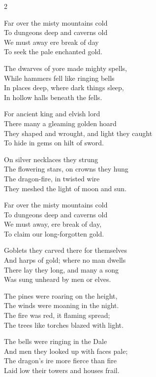 
\begin{multicols}{2}
    
\ve{}
Far over the misty mountains cold\\
To dungeons deep and caverns old\\
We must away ere break of day\\
To seek the pale enchanted gold.

\ve{}
The dwarves of yore made mighty spells,\\
While hammers fell like ringing bells\\
In places deep, where dark things sleep,\\
In hollow halls beneath the fells.

\ve{}
For ancient king and elvish lord\\
There many a gleaming golden hoard\\
They shaped and wrought, and light they caught\\
To hide in gems on hilt of sword.

\ve{}
On silver necklaces they strung\\
The flowering stars, on crowns they hung\\
The dragon-fire, in twisted wire\\
They meshed the light of moon and sun.

\ve{}
Far over the misty mountains cold\\
To dungeons deep and caverns old\\
We must away, ere break of day,\\
To claim our long-forgotten gold.

\ve{}
Goblets they carved there for themselves\\
And harps of gold; where no man dwells\\
There lay they long, and many a song\\
Was sung unheard by men or elves.

\ve{}
The pines were roaring on the height,\\
The winds were moaning in the night.\\
The fire was red, it flaming spread;\\
The trees like torches blazed with light.

\ve{}
The bells were ringing in the Dale\\
And men they looked up with faces pale;\\
The dragon’s ire more fierce than fire\\
Laid low their towers and houses frail.


\end{multicols}
